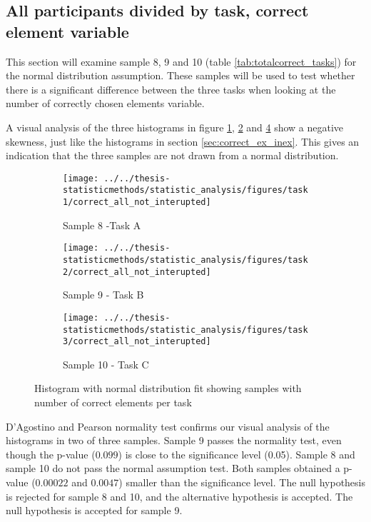 \begin{appendices}
\section{All participants divided by task,  correct element variable}\label{app:norm_8_9_10}

This section will examine sample 8, 9 and 10 (table \ref{tab:totalcorrect_tasks}) for the normal distribution assumption. These samples will be used to test whether there is a significant difference between the three tasks when looking at the number of correctly chosen elements variable. 

A visual analysis of the three histograms in figure \ref{fig:correctallnotinterupted_task1}, \ref{fig:correctallnotinterupted_task2} and \ref{fig:correctallnotinterupted_task3} show a negative skewness, just like the histograms in section \ref{sec:correct_ex_inex}. This gives an indication that the three samples are not drawn from a normal distribution.

\begin{figure}[H]
	\centering
	\begin{subfigure}[b]{0.32\linewidth}
		\centering
		\texttt{[image: ../../thesis-statisticmethods/statistic\_analysis/figures/task1/correct\_all\_not\_interupted]}
		\caption{Sample 8 -Task A}
		\label{fig:correctallnotinterupted_task1}
	\end{subfigure}
	\begin{subfigure}[b]{0.32\linewidth}
		\centering
		\texttt{[image: ../../thesis-statisticmethods/statistic\_analysis/figures/task2/correct\_all\_not\_interupted]}
		\caption{Sample 9 - Task B}
		\label{fig:correctallnotinterupted_task2}
	\end{subfigure}
	\begin{subfigure}[b]{0.32\linewidth}
		\centering
		\texttt{[image: ../../thesis-statisticmethods/statistic\_analysis/figures/task3/correct\_all\_not\_interupted]}
		\caption{Sample 10 - Task C}
		\label{fig:correctallnotinterupted_task3}
	\end{subfigure}
	\caption{Histogram with normal distribution fit showing samples with number of correct elements per task}
\end{figure}
D'Agostino and Pearson normality test confirms our visual analysis of the histograms in two of three samples. Sample 9 passes the normality test, even though the p-value ($0.099$) is close to the significance level (0.05). Sample 8 and sample 10 do not pass the normal assumption test. Both samples obtained a p-value ($0.00022$ and $0.0047$) smaller than the significance level. The null hypothesis is rejected for sample 8 and 10, and the alternative hypothesis is accepted. The null hypothesis is accepted for sample 9. 


\end{appendices}

